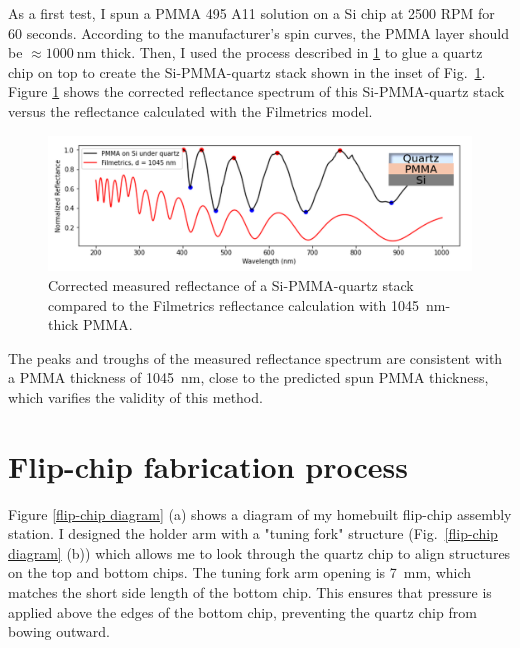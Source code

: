 \documentclass[double,12pt,1in,seploa]{beavtex}
\let\Oldsection\section
\renewcommand{\section}{\FloatBarrier\Oldsection}
\begin{document}
As a first test, I spun a PMMA 495 A11 solution on a Si chip at 2500 RPM for 60 seconds. According to the manufacturer's spin curves, the PMMA layer should be $\approx \SI{1000}{\nano\meter}$ thick. Then, I used the process described in \ref{FCfab} to glue a quartz chip on top to create the Si-PMMA-quartz stack shown in the inset of Fig.\ \ref{PMMAqzspec}. Figure \ref{PMMAqzspec} shows the corrected reflectance spectrum of this Si-PMMA-quartz stack versus the reflectance calculated with the Filmetrics model.


\begin{figure}
    \includegraphics[width=1\textwidth]{qzPMMAsi stack spec.PNG}
    \caption{Corrected measured reflectance of a Si-PMMA-quartz stack compared to the Filmetrics reflectance calculation with \SI{1045}{\nano\meter}-thick PMMA.}
    \label{PMMAqzspec}
\end{figure}
The peaks and troughs of the measured reflectance spectrum are consistent with a PMMA thickness of \SI{1045}{\nano\meter}, close to the predicted spun PMMA thickness, which varifies the validity of this method.

\section{Flip-chip fabrication process} \label{FCfab}
Figure \ref{flip-chip diagram} (a) shows a diagram of my homebuilt flip-chip assembly station. I designed the holder arm with a "tuning fork" structure (Fig.\ \ref{flip-chip diagram} (b)) which allows me to look through the quartz chip to align structures on the top and bottom chips. The tuning fork arm opening is \SI{7}{\milli\meter}, which matches the short side length of the bottom chip. This ensures that pressure is applied above the edges of the bottom chip, preventing the quartz chip from bowing outward. 
\end{document}
